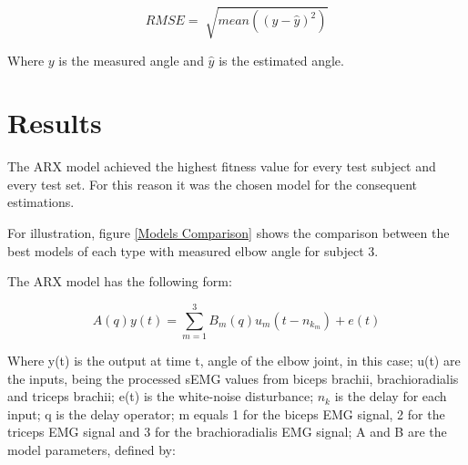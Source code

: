 \documentclass[letterpaper, 10 pt, conference]{ieeeconf}  %
\begin{document}
\begin{equation}
\label{eq:RMSE}
RMSE = \sqrt[]{mean((y-\hat{y})^2)}
\end{equation}


% 
% 

% 
% 

Where $y$ is the measured angle and $\hat{y}$ is the estimated angle.



\section{Results}

The ARX model achieved the highest fitness value for every test subject and every test set.  For this reason it was the chosen model for the consequent estimations.

For illustration, figure \ref{Models Comparison} shows the comparison between the best models of each type with measured elbow angle for subject 3.

The ARX model has the following form:

\begin{equation}
\label{eq:ARX}
A(q)y(t) = \sum_{m=1}^{3}B_m(q)u_m(t-n_{k_m})+e(t)
\end{equation}

Where y(t) is the output at time t, angle of the elbow joint, in this case; u(t) are the inputs, being the processed sEMG values from biceps brachii, brachioradialis and triceps brachii; e(t) is the white-noise disturbance; \(n_k\)  is the delay for each input; q is the delay operator; m equals 1 for the biceps EMG signal, 2 for the triceps EMG signal and 3 for the brachioradialis EMG signal; A and B are the model parameters, defined by:
\end{document}

